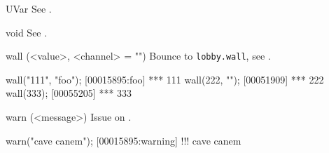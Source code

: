 \begin{urbiscriptapi}
\item[UVar] See .


\item[void] See .


\item[wall](<value>, <channel> = "")%
  Bounce to \lstinline|lobby.wall|, see .
\begin{urbiscript}
wall("111", "foo");
[00015895:foo] *** 111
wall(222, "");
[00051909] *** 222
wall(333);
[00055205] *** 333
\end{urbiscript}


\item[warn](<message>)%
  Issue  on .
\begin{urbiscript}
warn("cave canem");
[00015895:warning] !!! cave canem
\end{urbiscript}
\end{urbiscriptapi}

